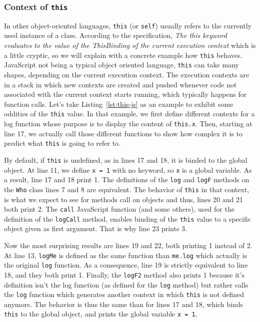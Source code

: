 \subsubsection{Context of {\texttt{this}}}%
\label{ssub:context_of_this}

In other object-oriented languages,
\verb|this| (or \verb|self|) usually refers to the currently used instance of a class.
According to the specification,
\textit{The this keyword evaluates to the value of the ThisBinding of the current execution context}
which is a little cryptic, so we will explain with a concrete example how \verb|this| behaves.
JavaScript not being a typical object oriented language,
\verb|this| can take many shapes, depending on the current execution context.
The execution contexts are in a stack in which new contexts are created and pushed
whenever code not associated with the current context starts running,
which typically happens for function calls.
Let's take Listing~\ref{lst:this-js} as an example
to exhibit some oddities of the \verb|this| value.
In that example, we first define different contexts for a log function
whose purpose is to display the content of \verb|this.x|.
Then, starting at line 17, we actually call those different functions
to show how complex it is to predict what \verb|this| is going to refer to.



By default, if \verb|this| is undefined, as in lines 17 and 18,
it is binded to the global object.
At line 11, we define \verb|x = 1| with no keyword,
so \verb|x| is a global variable.
As a result, line 17 and 18 print 1.
The definitions of the \verb|log| and \verb|logF| methods on the \verb|Who| class
lines 7 and 8 are equivalent. The behavior of \verb|this| in that context,
is what we expect to see for methods call on objects and thus,
lines 20 and 21 both print 2.
The \verb|call| JavaScript function (and some others),
used for the definition of the \verb|logCall| method,
enables binding of the \verb|this| value to a specific object given as first argument.
That is why line 23 prints 3.

Now the most surprising results are lines 19 and 22, both printing 1 instead of 2.
At line 13, \verb|logMe| is defined as the same function than \verb|me.log| which
actually is the original \verb|log| function.
As a consequence, line 19 is strictly equivalent to line 18, and they both print 1.
Finally, the \verb|logF2| method also prints 1 because it's definition isn't the log function
(as defined for the \verb|log| method) but rather calls the \verb|log| function which
generates another context in which \verb|this| is not defined anymore.
The behavior is thus the same than for lines 17 and 18, which binds \verb|this| to the global object,
and prints the global variable \verb|x = 1|.

